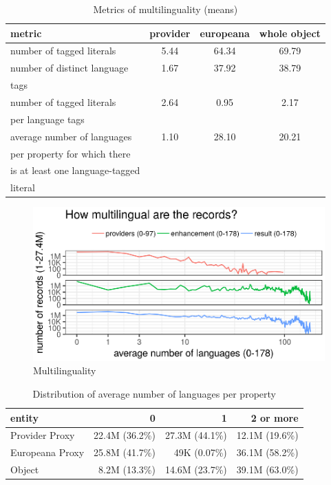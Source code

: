 \begin{table}
\caption{Metrics of multilinguality (means)}
\label{table:multilinguality_metrics}
\centering
\begin{tabular}{l|c|c|c}
metric & provider & europeana & whole object \\
\hline
number of tagged literals & 5.44 & 64.34 & 69.79 \\
\hline
number of distinct language & 1.67 & 37.92 & 38.79 \\
tags & & & \\
\hline
number of tagged literals & 2.64 & 0.95 & 2.17 \\
per language tags & & & \\
\hline
average number of languages & 1.10 & 28.10 & 20.21 \\
per property for which there & & & \\
is at least one language-tagged & & & \\
 literal & & & \\
\end{tabular}
\end{table}

\begin{figure}[ht]
\includegraphics[width=\textwidth]{images/chapter02/multilinguality-summary.eps}
\centering
\caption{Multilinguality}
\label{fig:multilinguality}
\end{figure}

\begin{table}
\caption{Distribution of average number of languages per property}
\label{table:multilinguality_distribution}
\centering
\begin{tabular}{l|r|r|r}
entity & 0 & 1 & 2 or more \\
\hline
Provider Proxy & 22.4M (36.2\%) & 27.3M (44.1\%) & 12.1M (19.6\%) \\
Europeana Proxy & 25.8M (41.7\%) & 49K (0.07\%) & 36.1M (58.2\%) \\
Object & 8.2M (13.3\%) & 14.6M (23.7\%) & 39.1M (63.0\%) \\   
\end{tabular}
\end{table}

